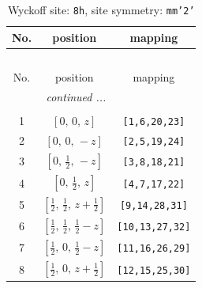 \documentclass[fleqn,8pt]{jsarticle}
\begin{document}
\begin{longtable}{ccc}
\caption{Wyckoff site: {\tt 8h}, site symmetry: {\tt mm'2'}}
 \\
 \hline \hline
No. & position & mapping \\ \hline \endfirsthead

\multicolumn{2}{l}{\tablename\ \thetable{}} \\
 \hline \hline
No. & position & mapping \\ \hline \endhead

 \hline \hline
\multicolumn{2}{r}{\footnotesize\it continued ...} \\ \endfoot

 \hline \hline
\multicolumn{2}{r}{} \\ \endlastfoot

1 & $\left[ 0,\, 0,\, z \right]$ & {\tt [1,6,20,23]} \\ \hline
2 & $\left[ 0,\, 0,\, - z \right]$ & {\tt [2,5,19,24]} \\ \hline
3 & $\left[ 0,\, \frac{1}{2},\, - z \right]$ & {\tt [3,8,18,21]} \\ \hline
4 & $\left[ 0,\, \frac{1}{2},\, z \right]$ & {\tt [4,7,17,22]} \\ \hline
5 & $\left[ \frac{1}{2},\, \frac{1}{2},\, z + \frac{1}{2} \right]$ & {\tt [9,14,28,31]} \\ \hline
6 & $\left[ \frac{1}{2},\, \frac{1}{2},\, \frac{1}{2} - z \right]$ & {\tt [10,13,27,32]} \\ \hline
7 & $\left[ \frac{1}{2},\, 0,\, \frac{1}{2} - z \right]$ & {\tt [11,16,26,29]} \\ \hline
8 & $\left[ \frac{1}{2},\, 0,\, z + \frac{1}{2} \right]$ & {\tt [12,15,25,30]} \\
\end{longtable}
\renewcommand{\arraystretch}{1.2}
\end{document}
